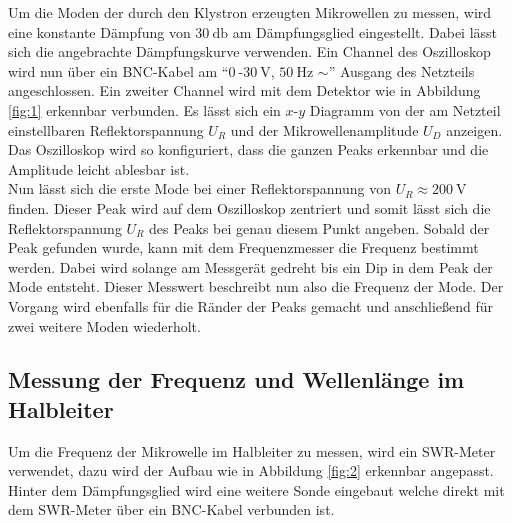 Um die Moden der durch den Klystron erzeugten Mikrowellen zu messen, wird eine konstante Dämpfung von $\SI{30}{\decibel}$ am Dämpfungsglied eingestellt. 
Dabei lässt sich die angebrachte Dämpfungskurve verwenden. Ein Channel des Oszilloskop wird nun
über ein BNC-Kabel am \enquote{$\SI{0}{}$-$\SI{30}{\volt}$, $\SI{50}{\hertz}$ $\sim$} Ausgang des Netzteils angeschlossen. Ein zweiter Channel wird mit dem Detektor wie in Abbildung \ref{fig:1}
erkennbar verbunden. Es lässt sich ein $x$-$y$ Diagramm von der am Netzteil einstellbaren Reflektorspannung $U_R$ und der Mikrowellenamplitude $U_D$ anzeigen. Das Oszilloskop wird so konfiguriert, dass die ganzen Peaks erkennbar 
und die Amplitude leicht ablesbar ist. 
\\
\newline
Nun lässt sich die erste Mode bei einer Reflektorspannung von $U_R \approx \SI{200}{\volt}$ finden. Dieser Peak wird auf dem Oszilloskop zentriert und somit lässt sich die Reflektorspannung $U_R$ des Peaks bei genau diesem Punkt angeben.
Sobald der Peak gefunden wurde, kann mit dem Frequenzmesser die Frequenz bestimmt werden. Dabei wird solange am Messgerät gedreht bis ein Dip in dem Peak der Mode entsteht. Dieser Messwert beschreibt nun also die Frequenz der Mode.
Der Vorgang wird ebenfalls für die Ränder der Peaks gemacht und anschließend für zwei weitere Moden wiederholt.
\\
\subsection{Messung der Frequenz und Wellenlänge im Halbleiter}
Um die Frequenz der Mikrowelle im Halbleiter zu messen, wird ein SWR-Meter verwendet, dazu wird der Aufbau wie in Abbildung \ref{fig:2} erkennbar angepasst. Hinter dem Dämpfungsglied wird eine weitere Sonde eingebaut welche direkt mit dem SWR-Meter über
ein BNC-Kabel verbunden ist.

